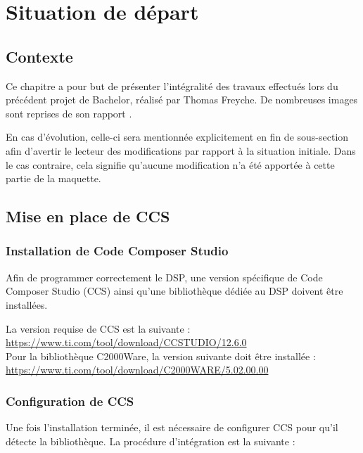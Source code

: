 \chapter{Situation de départ}

\section{Contexte}
Ce chapitre a pour but de présenter l'intégralité des travaux effectués lors du précédent projet de Bachelor, réalisé par Thomas Freyche. De nombreuses images sont reprises de son rapport \cite{Freyche}.

En cas d'évolution, celle-ci sera mentionnée explicitement en fin de sous-section afin d'avertir le lecteur des modifications par rapport à la situation initiale. Dans le cas contraire, cela signifie qu'aucune modification n'a été apportée à cette partie de la maquette.

\section{Mise en place de CCS}
\label{sec:MiseEnPlace}

\subsection{Installation de Code Composer Studio}
Afin de programmer correctement le DSP, une version spécifique de Code Composer Studio (CCS) ainsi qu'une bibliothèque dédiée au DSP doivent être installées.

La version requise de CCS est la suivante \cite{CCS_Install} :
\url{https://www.ti.com/tool/download/CCSTUDIO/12.6.0} \\

Pour la bibliothèque C2000Ware, la version suivante doit être installée \cite{C2000_Install} :
\url{https://www.ti.com/tool/download/C2000WARE/5.02.00.00}\\

\subsection{Configuration de CCS}

Une fois l'installation terminée, il est nécessaire de configurer CCS pour qu'il détecte la bibliothèque. La procédure d'intégration est la suivante :

